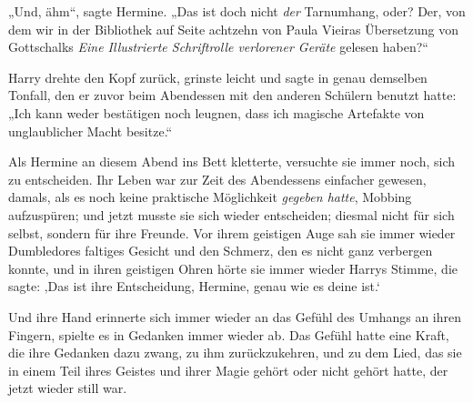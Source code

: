 „Und, ähm“, sagte Hermine. „Das ist doch nicht \emph{der} Tarnumhang, oder? Der, von dem wir in der Bibliothek auf Seite achtzehn von Paula Vieiras Übersetzung von Gottschalks \emph{Eine Illustrierte Schriftrolle verlorener Geräte} gelesen haben?“

Harry drehte den Kopf zurück, grinste leicht und sagte in genau demselben Tonfall, den er zuvor beim Abendessen mit den anderen Schülern benutzt hatte: „Ich kann weder bestätigen noch leugnen, dass ich magische Artefakte von unglaublicher Macht besitze.“

\later

Als Hermine an diesem Abend ins Bett kletterte, versuchte sie immer noch, sich zu entscheiden. Ihr Leben war zur Zeit des Abendessens einfacher gewesen, damals, als es noch keine praktische Möglichkeit \emph{gegeben hatte}, Mobbing aufzuspüren; und jetzt musste sie sich wieder entscheiden; diesmal nicht für sich selbst, sondern für ihre Freunde. Vor ihrem geistigen Auge sah sie immer wieder Dumbledores faltiges Gesicht und den Schmerz, den es nicht ganz verbergen konnte, und in ihren geistigen Ohren hörte sie immer wieder Harrys Stimme, die sagte: ‚Das ist ihre Entscheidung, Hermine, genau wie es deine ist.‘

Und ihre Hand erinnerte sich immer wieder an das Gefühl des Umhangs an ihren Fingern, spielte es in Gedanken immer wieder ab. Das Gefühl hatte eine Kraft, die ihre Gedanken dazu zwang, zu ihm zurückzukehren, und zu dem Lied, das sie in einem Teil ihres Geistes und ihrer Magie gehört oder nicht gehört hatte, der jetzt wieder still war.

